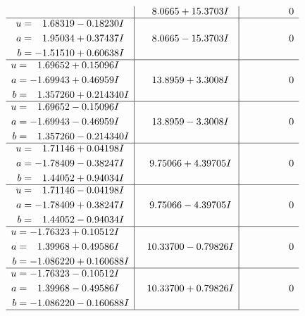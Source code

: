 \documentclass[1p]{elsarticle_modified}
\theoremstyle{definition}
\begin{document}
$$\begin{array}{c|c|c}
 & \phantom{-}8.0665 + 15.3703 I & \phantom{-0.000000 } 0 \\ \hline\begin{aligned}
u &= \phantom{-}1.68319 - 0.18230 I \\
a &= \phantom{-}1.95034 + 0.37437 I \\
b &= -1.51510 + 0.60638 I\end{aligned}
 & \phantom{-}8.0665 - 15.3703 I & \phantom{-0.000000 } 0 \\ \hline\begin{aligned}
u &= \phantom{-}1.69652 + 0.15096 I \\
a &= -1.69943 + 0.46959 I \\
b &= \phantom{-}1.357260 + 0.214340 I\end{aligned}
 & \phantom{-}13.8959 + 3.3008 I & \phantom{-0.000000 } 0 \\ \hline\begin{aligned}
u &= \phantom{-}1.69652 - 0.15096 I \\
a &= -1.69943 - 0.46959 I \\
b &= \phantom{-}1.357260 - 0.214340 I\end{aligned}
 & \phantom{-}13.8959 - 3.3008 I & \phantom{-0.000000 } 0 \\ \hline\begin{aligned}
u &= \phantom{-}1.71146 + 0.04198 I \\
a &= -1.78409 - 0.38247 I \\
b &= \phantom{-}1.44052 + 0.94034 I\end{aligned}
 & \phantom{-}9.75066 + 4.39705 I & \phantom{-0.000000 } 0 \\ \hline\begin{aligned}
u &= \phantom{-}1.71146 - 0.04198 I \\
a &= -1.78409 + 0.38247 I \\
b &= \phantom{-}1.44052 - 0.94034 I\end{aligned}
 & \phantom{-}9.75066 - 4.39705 I & \phantom{-0.000000 } 0 \\ \hline\begin{aligned}
u &= -1.76323 + 0.10512 I \\
a &= \phantom{-}1.39968 + 0.49586 I \\
b &= -1.086220 + 0.160688 I\end{aligned}
 & \phantom{-}10.33700 - 0.79826 I & \phantom{-0.000000 } 0 \\ \hline\begin{aligned}
u &= -1.76323 - 0.10512 I \\
a &= \phantom{-}1.39968 - 0.49586 I \\
b &= -1.086220 - 0.160688 I\end{aligned}
 & \phantom{-}10.33700 + 0.79826 I & \phantom{-0.000000 } 0\\
 \hline 
 \end{array}$$\newpage\newpage\renewcommand{\arraystretch}{1}
\end{document}
